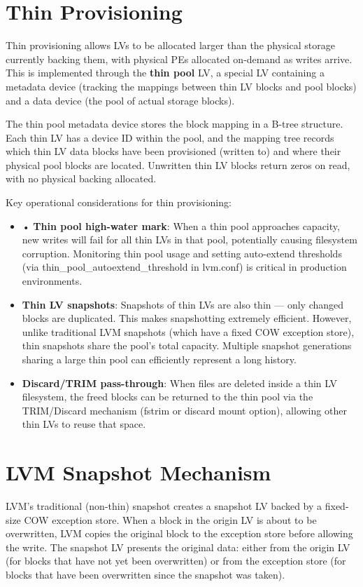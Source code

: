 \section{Thin Provisioning}
Thin provisioning allows LVs to be allocated larger than the physical storage currently backing them, with physical PEs allocated on-demand as writes arrive. This is implemented through the \textbf{thin pool} LV, a special LV containing a metadata device (tracking the mappings between thin LV blocks and pool blocks) and a data device (the pool of actual storage blocks).

The thin pool metadata device stores the block mapping in a B-tree structure. Each thin LV has a device ID within the pool, and the mapping tree records which thin LV data blocks have been provisioned (written to) and where their physical pool blocks are located. Unwritten thin LV blocks return zeros on read, with no physical backing allocated.

Key operational considerations for thin provisioning:

\begin{itemize}
  \item • \textbf{Thin pool high-water mark}: When a thin pool approaches capacity, new writes will fail for all thin LVs in that pool, potentially causing filesystem corruption. Monitoring thin pool usage and setting auto-extend thresholds (via thin\_pool\_autoextend\_threshold in lvm.conf) is critical in production environments.
  \item \textbf{Thin LV snapshots}: Snapshots of thin LVs are also thin --- only changed blocks are duplicated. This makes snapshotting extremely efficient. However, unlike traditional LVM snapshots (which have a fixed COW exception store), thin snapshots share the pool's total capacity. Multiple snapshot generations sharing a large thin pool can efficiently represent a long history.
  \item \textbf{Discard/TRIM pass-through}: When files are deleted inside a thin LV filesystem, the freed blocks can be returned to the thin pool via the TRIM/Discard mechanism (fstrim or discard mount option), allowing other thin LVs to reuse that space.
\end{itemize}

\section{LVM Snapshot Mechanism}
LVM's traditional (non-thin) snapshot creates a snapshot LV backed by a fixed-size COW exception store. When a block in the origin LV is about to be overwritten, LVM copies the original block to the exception store before allowing the write. The snapshot LV presents the original data: either from the origin LV (for blocks that have not yet been overwritten) or from the exception store (for blocks that have been overwritten since the snapshot was taken).

